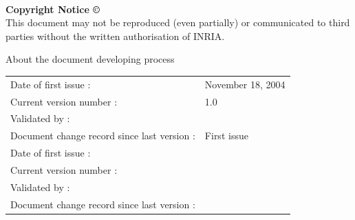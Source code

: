 \textsf{ }\\
\begin{center}
\textbf{Copyright Notice \copyright}\\
This document may not be reproduced (even partially) or communicated to third parties without the written authorisation of INRIA.
\end{center}
\renewcommand{\arraystretch}{1.8}


\pagebreak
\begin{center}
  \textsf{\Large About the document developing process}
\end{center}
\begin{tabular}{|p{}|p{}|}
\hline
Date of first issue : &\textsf{November 18, 2004}\\
Current version number : &\textsf{1.0}\\ 
Validated by :& \textsf{}\\
\hline
Document change record since last version : &\textsf{First issue} \\
\hline
\hline
Date of first issue : &\textsf{}\\
Current version number : &\textsf{}\\ 
Validated by :& \textsf{}\\
\hline
Document change record since last version : &\textsf{} \\
\hline

\end{tabular}

%

